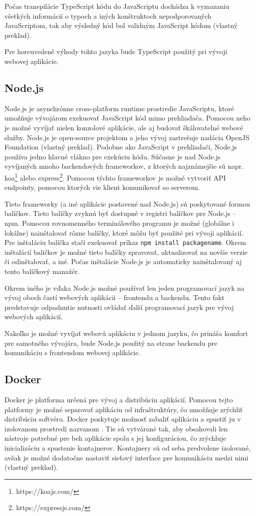 Počas transpilácie TypeScript kódu do JavaScriptu dochádza k vymazaniu všetkých informácií o typoch a iných konštruktoch nepodporovaných JavaScriptom, tak aby výsledný kód bol validným JavaScript kódom \cite{about_typescript} (vlastný preklad).

Pre horeuvedené výhody tohto jazyka bude TypeScript použitý pri vývoji webovej aplikácie.

\subsection {Node.js}
Node.js je asynchrónne cross-platform runtime prostredie JavaScriptu, ktoré umožňuje vývojárom exekuovať JavaScript kód mimo prehliadača. Pomocou neho je možné vyvíjať nielen konzolové aplikácie, ale aj budovať škálovateľné webové služby. Node.js je open-source projektom a jeho vývoj zastrešuje nadácia OpenJS Foundation \cite{about_nodejs} (vlastný preklad). Podobne ako JavaScript v prehliadači, Node.js používa jedno hlavné vlákno pre exekúciu kódu. Súčasne je nad Node.js vyvíjaných mnoho backendových frameworkov, z ktorých najznámejšie sú napr. koa\footnote{https://koajs.com/} alebo express\footnote{https://expressjs.com/}. Pomocou týchto frameworkov je možné vytvoriť API endpointy, pomocou ktorých vie klient komunikovať so serverom.

Tieto frameworky (a iné aplikácie postavené nad Node.js) sú poskytované formou balíčkov. Tieto balíčky zvyknú byť dostupné v registri balíčkov pre Node.js -- npm. Pomocou rovnomenného terminálového programu je možné (globálne i lokálne) nainštalovať rôzne balíčky, ktoré môžu byť použité pri vývoji aplikácií. Pre inštaláciu balíčka stačí exekuovať príkaz \texttt{npm install packagename}. Okrem inštalácií balíčkov je možné tieto balíčky spravovať, aktualizovať na novšie verzie či odinštalovať, a iné. Počas inštalácie Node.js je automaticky nainštalovaný aj tento balíčkový manažér.

Okrem iného je vďaka Node.js možné používať len jeden programovací jazyk na vývoj oboch častí webových aplikácii -- frontendu a backendu. Tento fakt predstavuje odpadnutie nutnosti ovládať ďalší programovací jazyk pre vývoj webových aplikácií.

Nakoľko je možné vyvíjať webovú aplikáciu v jednom jazyku, čo prináša komfort pre samotného vývojára, bude Node.js použitý na strane backendu pre komunikáciu s frontendom webovej aplikácie.

\subsection {Docker}
Docker je platforma určená pre vývoj a distribúciu aplikácií. Pomocou tejto platformy je možné separovať aplikáciu od infraštruktúry, čo umožňuje zrýchliť distribúciu softvéru. Docker poskytuje možnosť zabaliť aplikáciu a spustiť ju v izolovanom prostredí nazvanom . Tie sú vytvárané tak, aby obsahovali len nástroje potrebné pre beh aplikácie spolu s jej konfiguráciou, čo zrýchluje inicializáciu a spustenie kontajnerov. Kontajnery sú od seba predvolene izolované, avšak je možné dodatočne nastaviť sieťový interface pre komunikáciu medzi nimi \cite{about_docker} (vlastný preklad).


